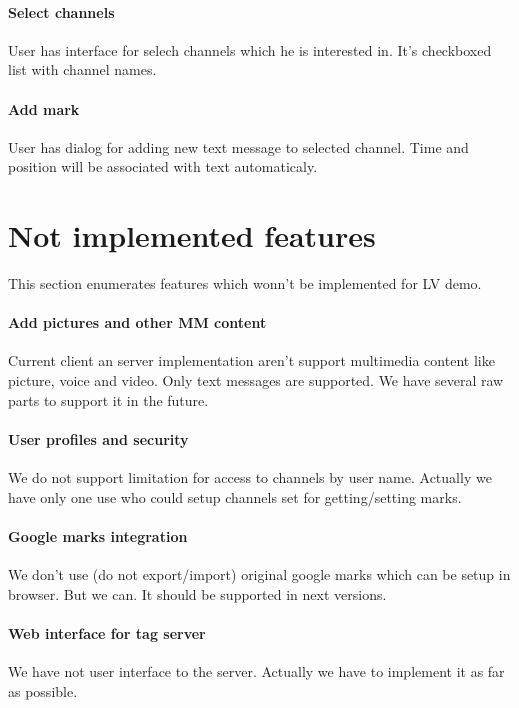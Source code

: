 \documentclass[12pt]{article}
\begin{document}
\paragraph{Select channels }

User has interface for selech channels which he is interested in. It's checkboxed list
with channel names.

\paragraph{Add mark}

User has dialog for adding new text message to selected channel. Time and position will
be associated with text automaticaly.

\section{Not implemented features}

This section enumerates features which wonn't be implemented for LV demo.

\paragraph{Add pictures and other MM content}

Current client an server implementation aren't support multimedia content like picture,
voice and video. Only text messages are supported. We have several raw parts to support 
it in the future.

\paragraph{User profiles and security}

We do not support limitation for access to channels by user name. Actually we have only
one use who could setup channels set for getting/setting marks.

\paragraph{Google marks integration}

We don't use (do not export/import) original google marks which can be setup in browser.
But we can. It should be supported in next versions.

\paragraph{Web interface for tag server}

We have not user interface to the server. Actually we have to implement it as far as possible.
\end{document}
